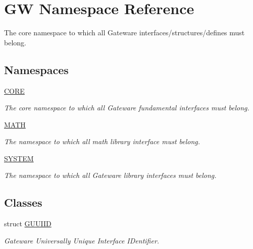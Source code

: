 \hypertarget{namespaceGW}{}\section{GW Namespace Reference}
\label{namespaceGW}


The core namespace to which all Gateware interfaces/structures/defines must belong.  


\subsection*{Namespaces}
\begin{DoxyCompactItemize}
\item 
 \hyperlink{namespaceGW_1_1CORE}{C\+O\+RE}
\begin{DoxyCompactList}\small\item\em The core namespace to which all Gateware fundamental interfaces must belong. \end{DoxyCompactList}\item 
 \hyperlink{namespaceGW_1_1MATH}{M\+A\+TH}
\begin{DoxyCompactList}\small\item\em The namespace to which all math library interface must belong. \end{DoxyCompactList}\item 
 \hyperlink{namespaceGW_1_1SYSTEM}{S\+Y\+S\+T\+EM}
\begin{DoxyCompactList}\small\item\em The namespace to which all Gateware library interfaces must belong. \end{DoxyCompactList}\end{DoxyCompactItemize}
\subsection*{Classes}
\begin{DoxyCompactItemize}
\item 
struct \hyperlink{structGW_1_1GUUIID}{G\+U\+U\+I\+ID}
\begin{DoxyCompactList}\small\item\em Gateware Universally Unique Interface I\+Dentifier. \end{DoxyCompactList}\end{DoxyCompactItemize}
